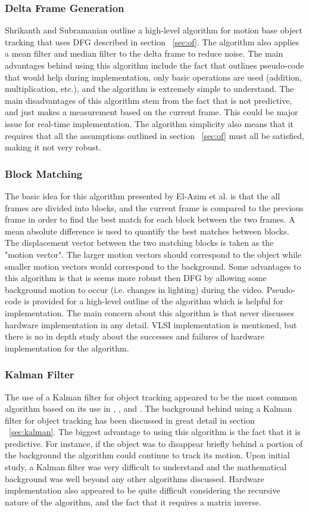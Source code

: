 \documentclass[11pt]{article} %
\begin{document}
\subsubsection{Delta Frame Generation}
Shrikanth and Subramanian \cite{8} outline a high-level algorithm for motion base object tracking that uses DFG described in section ~\ref{sec:of}. The algorithm also applies a mean filter and median filter to the delta frame to reduce noise. The main advantages behind using this algorithm include the fact that \cite{8} outlines pseudo-code that would help during implementation, only basic operations are used (addition, multiplication, etc.), and the algorithm is extremely simple to understand. The main disadvantages of this algorithm stem from the fact that is not predictive, and just makes a measurement based on the current frame. This could be major issue for real-time implementation. The algorithm simplicity also means that it requires that all the assumptions outlined in section ~\ref{sec:of} must all be satisfied, making it not very robust.
\subsubsection{Block Matching}
The basic idea for this algorithm presented by El-Azim et al. \cite{5} is that the all frames are divided into blocks, and the current frame is compared to the previous frame in order to find the best match for each block between the two frames. A mean absolute difference is used to quantify the best matches between blocks. The displacement vector between the two matching blocks is taken as the "motion vector". The larger motion vectors should correspond to the object while smaller motion vectors would correspond to the background. Some advantages to this algorithm is that is seems more robust then DFG by allowing some background motion to occur (i.e. changes in lighting) during the video. Pseudo-code is provided for a high-level outline of the algorithm which is helpful for implementation. The main concern about this algorithm is that \cite{5} never discusses hardware implementation in any detail. VLSI implementation is mentioned, but there is no in depth study about the successes and failures of hardware implementation for the algorithm.
\subsubsection{Kalman Filter}
The use of a Kalman filter for object tracking appeared to be the most common algorithm based on its use in \cite{4}, \cite{7}, and \cite{9}. The background behind using a Kalman filter for object tracking has been discussed in great detail in section ~\ref{sec:kalman}. The biggest advantage to using this algorithm is the fact that it is predictive. For instance, if the object was to disappear briefly behind a portion of the background the algorithm could continue to track its motion. Upon initial study, a Kalman filter was very difficult to understand and the mathematical background was well beyond any other algorithms discussed. Hardware implementation also appeared to be quite difficult considering the recursive nature of the algorithm, and the fact that it requires a matrix inverse.
\end{document}
